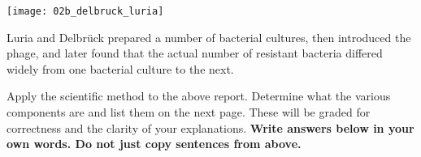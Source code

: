 \documentclass[12pt, addpoints]{exam}
\begin{document}
\noindent\texttt{[image: 02b\_delbruck\_luria]}

\vspace*{\baselineskip}

Luria and Delbrück prepared a number of bacterial cultures, then
introduced the phage, and later found that the actual number of
resistant bacteria differed widely from one bacterial culture to the
next.

Apply the scientific method to the above report. Determine what the various
components are and list them on the next page. These will be graded for
correctness and the clarity of your explanations. \textbf{Write answers below in
 your own words. Do not just copy sentences from above.}
\end{document}
